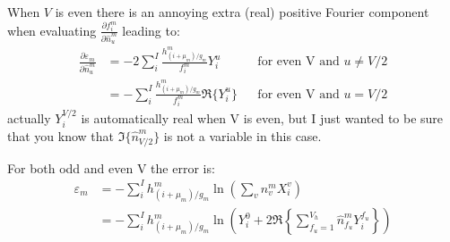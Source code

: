 \documentclass[11pt]{article}
\begin{document}
When $V$ is even there is an annoying extra (real) positive Fourier component when evaluating $\frac{\partial f^m_i}{\partial \hat{n}^m_u}$ leading to:
\begin{align*}
   \frac{\partial \varepsilon_m}{\partial \hat{n}^m_u} &= - 2 \sum_i^I \frac{h^m_{(i+\mu_m)/g_m}}{f^m_i} Y^{u}_i && \text{for even V and } u \neq V/2 \\
   &= - \sum_i^I \frac{h^m_{(i+\mu_m)/g_m}}{f^m_i} \Re\{Y^{u}_i\} &&\text{for even V and } u = V/2 
\end{align*}
actually $Y^{V/2}_i$ is automatically real when V is even, but I just wanted to be sure that you know that $\Im\{ \hat{n}^m_{V/2}\}$ is not a variable in this case.

For both odd and even V the error is:
\begin{align*}
   \varepsilon_m &= - \sum_i^I h^m_{(i+\mu_m)/g_m} \ln\left(\sum_v n^m_v X^v_i\right) \\
   &= - \sum_i^I h^m_{(i+\mu_m)/g_m} \ln\left(Y^0_i + 2\Re\left\{\sum_{f_u=1}^{V_h} \hat{n}^m_{f_u} Y^{f_u}_i\right\}\right)
\end{align*}
\end{document}
